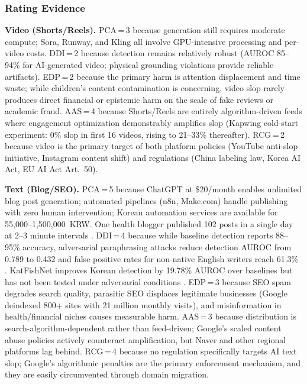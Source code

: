 \documentclass[12pt,a4paper]{article}
\begin{document}
\subsubsection*{Rating Evidence}

\textbf{Video (Shorts/Reels).} PCA\,=\,3 because generation still requires moderate compute; Sora, Runway, and Kling all involve GPU-intensive processing and per-video costs. DDI\,=\,2 because detection remains relatively robust (AUROC 85--94\% for AI-generated video; physical grounding violations provide reliable artifacts). EDP\,=\,2 because the primary harm is attention displacement and time waste; while children's content contamination is concerning, video slop rarely produces direct financial or epistemic harm on the scale of fake reviews or academic fraud. AAS\,=\,4 because Shorts/Reels are entirely algorithm-driven feeds where engagement optimization demonstrably amplifies slop (Kapwing cold-start experiment: 0\% slop in first 16 videos, rising to 21--33\% thereafter). RCG\,=\,2 because video is the primary target of both platform policies (YouTube anti-slop initiative, Instagram content shift) and regulations (China labeling law, Korea AI Act, EU AI Act Art.~50).

\textbf{Text (Blog/SEO).} PCA\,=\,5 because ChatGPT at \$20/month enables unlimited blog post generation; automated pipelines (n8n, Make.com) handle publishing with zero human intervention; Korean automation services are available for 55,000--1,500,000~KRW. One health blogger published 102 posts in a single day at 2--3 minute intervals \parencite{NewsVerse2025}. DDI\,=\,4 because while baseline detection reports 88--95\% accuracy, adversarial paraphrasing attacks reduce detection AUROC from 0.789 to 0.432 \parencite{Ranganath2026} and false positive rates for non-native English writers reach 61.3\% \parencite{Liang2023}. KatFishNet improves Korean detection by 19.78\% AUROC over baselines but has not been tested under adversarial conditions \parencite{Park2025}. EDP\,=\,3 because SEO spam degrades search quality, parasitic SEO displaces legitimate businesses (Google deindexed 800+ sites with 21 million monthly visits), and misinformation in health/financial niches causes measurable harm. AAS\,=\,3 because distribution is search-algorithm-dependent rather than feed-driven; Google's scaled content abuse policies actively counteract amplification, but Naver and other regional platforms lag behind. RCG\,=\,4 because no regulation specifically targets AI text slop; Google's algorithmic penalties are the primary enforcement mechanism, and they are easily circumvented through domain migration.
\end{document}
